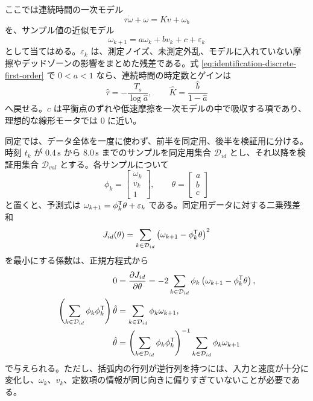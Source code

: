 ここでは連続時間の一次モデル
\begin{equation}
  \tau\dot{\omega}+\omega=Kv+\omega_b
  \label{eq:identification-first-order-model}
\end{equation}
を、サンプル値の近似モデル
\begin{equation}
  \omega_{k+1}
  =
  a\omega_k+bv_k+c+\varepsilon_k
  \label{eq:identification-discrete-first-order}
\end{equation}
として当てはめる。$\varepsilon_k$ は、測定ノイズ、未測定外乱、モデルに入れていない摩擦やデッドゾーンの影響をまとめた残差である。式 \eqref{eq:identification-discrete-first-order} で $0<a<1$ なら、連続時間の時定数とゲインは
\begin{equation}
  \hat{\tau}
  =
  -\frac{T_s}{\log \hat{a}},
  \qquad
  \hat{K}
  =
  \frac{\hat{b}}{1-\hat{a}}
  \label{eq:identification-continuous-parameters}
\end{equation}
へ戻せる。$c$ は平衡点のずれや低速摩擦を一次モデルの中で吸収する項であり、理想的な線形モータでは 0 に近い。

同定では、データ全体を一度に使わず、前半を同定用、後半を検証用に分ける。時刻 $t_k$ が $0.4\,\mathrm{s}$ から $8.0\,\mathrm{s}$ までのサンプルを同定用集合 $\mathcal{D}_{id}$ とし、それ以降を検証用集合 $\mathcal{D}_{val}$ とする。各サンプルについて
\begin{equation}
  \phi_k=
  \begin{bmatrix}
    \omega_k\\
    v_k\\
    1
  \end{bmatrix},
  \qquad
  \theta=
  \begin{bmatrix}
    a\\
    b\\
    c
  \end{bmatrix}
\end{equation}
と置くと、予測式は $\omega_{k+1}=\phi_k^{\mathsf{T}} \theta+\varepsilon_k$ である。同定用データに対する二乗残差和
\begin{equation}
  J_{id}(\theta)
  =
  \sum_{k\in\mathcal{D}_{id}}
  \left(\omega_{k+1}-\phi_k^{\mathsf{T}} \theta\right)^2
  \label{eq:identification-least-squares-cost}
\end{equation}
を最小にする係数は、正規方程式から
\begin{align}
  0
  &=
  \frac{\partial J_{id}}{\partial \theta}
  =
  -2\sum_{k\in\mathcal{D}_{id}}
  \phi_k\left(\omega_{k+1}-\phi_k^{\mathsf{T}} \theta\right),\\
  \left(\sum_{k\in\mathcal{D}_{id}}\phi_k\phi_k^{\mathsf{T}}\right)\hat{\theta}
  &=
  \sum_{k\in\mathcal{D}_{id}}\phi_k\omega_{k+1},\\
  \hat{\theta}
  &=
  \left(\sum_{k\in\mathcal{D}_{id}}\phi_k\phi_k^{\mathsf{T}}\right)^{-1}
  \sum_{k\in\mathcal{D}_{id}}\phi_k\omega_{k+1}
  \label{eq:identification-normal-equation}
\end{align}
で与えられる。ただし、括弧内の行列が逆行列を持つには、入力と速度が十分に変化し、$\omega_k$、$v_k$、定数項の情報が同じ向きに偏りすぎていないことが必要である。


